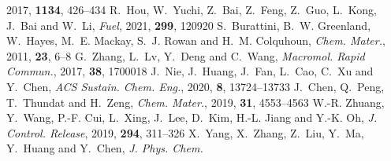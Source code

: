 \documentclass[twoside,twocolumn,9pt]{article}
\begin{document}
\begin{mcitethebibliography}{79}
  2017, \textbf{1134}, 426--434\relax
\mciteBstWouldAddEndPuncttrue
\mciteSetBstMidEndSepPunct{\mcitedefaultmidpunct}
{\mcitedefaultendpunct}{\mcitedefaultseppunct}\relax
\EndOfBibitem
{}
R.~Hou, W.~Yuchi, Z.~Bai, Z.~Feng, Z.~Guo, L.~Kong, J.~Bai and W.~Li,
  \emph{Fuel}, 2021, \textbf{299}, 120920\relax
\mciteBstWouldAddEndPuncttrue
\mciteSetBstMidEndSepPunct{\mcitedefaultmidpunct}
{\mcitedefaultendpunct}{\mcitedefaultseppunct}\relax
\EndOfBibitem
{}
S.~Burattini, B.~W. Greenland, W.~Hayes, M.~E. Mackay, S.~J. Rowan and H.~M.
  Colquhoun, \emph{Chem. Mater.}, 2011, \textbf{23}, 6--8\relax
\mciteBstWouldAddEndPuncttrue
\mciteSetBstMidEndSepPunct{\mcitedefaultmidpunct}
{\mcitedefaultendpunct}{\mcitedefaultseppunct}\relax
\EndOfBibitem
{}
G.~Zhang, L.~Lv, Y.~Deng and C.~Wang, \emph{Macromol. Rapid Commun.}, 2017,
  \textbf{38}, 1700018\relax
\mciteBstWouldAddEndPuncttrue
\mciteSetBstMidEndSepPunct{\mcitedefaultmidpunct}
{\mcitedefaultendpunct}{\mcitedefaultseppunct}\relax
\EndOfBibitem
{}
J.~Nie, J.~Huang, J.~Fan, L.~Cao, C.~Xu and Y.~Chen, \emph{ACS Sustain. Chem.
  Eng.}, 2020, \textbf{8}, 13724--13733\relax
\mciteBstWouldAddEndPuncttrue
\mciteSetBstMidEndSepPunct{\mcitedefaultmidpunct}
{\mcitedefaultendpunct}{\mcitedefaultseppunct}\relax
\EndOfBibitem
{}
J.~Chen, Q.~Peng, T.~Thundat and H.~Zeng, \emph{Chem. Mater.}, 2019,
  \textbf{31}, 4553--4563\relax
\mciteBstWouldAddEndPuncttrue
\mciteSetBstMidEndSepPunct{\mcitedefaultmidpunct}
{\mcitedefaultendpunct}{\mcitedefaultseppunct}\relax
\EndOfBibitem
{}
W.-R. Zhuang, Y.~Wang, P.-F. Cui, L.~Xing, J.~Lee, D.~Kim, H.-L. Jiang and
  Y.-K. Oh, \emph{J. Control. Release}, 2019, \textbf{294}, 311--326\relax
\mciteBstWouldAddEndPuncttrue
\mciteSetBstMidEndSepPunct{\mcitedefaultmidpunct}
{\mcitedefaultendpunct}{\mcitedefaultseppunct}\relax
\EndOfBibitem
{}
X.~Yang, X.~Zhang, Z.~Liu, Y.~Ma, Y.~Huang and Y.~Chen, \emph{J. Phys. Chem.
}
\end{mcitethebibliography}
\end{document}
